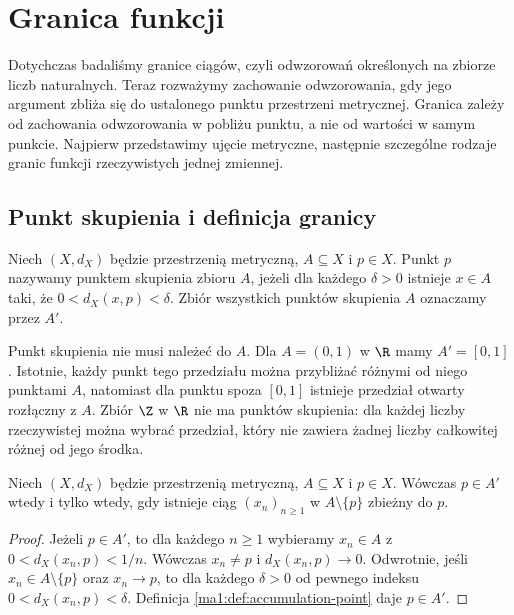 \chapter{Granica funkcji}
\label{ma1:ch:function-limits}

Dotychczas badaliśmy granice ciągów, czyli odwzorowań określonych na zbiorze liczb naturalnych. Teraz rozważymy zachowanie odwzorowania, gdy jego argument zbliża się do ustalonego punktu przestrzeni metrycznej. Granica zależy od zachowania odwzorowania w pobliżu punktu, a nie od wartości w samym punkcie. Najpierw przedstawimy ujęcie metryczne, następnie szczególne rodzaje granic funkcji rzeczywistych jednej zmiennej.

\section{Punkt skupienia i definicja granicy}
\begin{definicja}
\label{ma1:def:accumulation-point}
Niech $(X,d_X)$ będzie przestrzenią metryczną, $A\subseteq X$ i $p\in X$. Punkt $p$ nazywamy punktem skupienia zbioru $A$, jeżeli dla każdego $\delta>0$ istnieje $x\in A$ taki, że $0<d_X(x,p)<\delta$. Zbiór wszystkich punktów skupienia $A$ oznaczamy przez $A'$.
\end{definicja}
Punkt skupienia nie musi należeć do $A$. Dla $A=(0,1)$ w $\R$ mamy $A'=[0,1]$. Istotnie, każdy punkt tego przedziału można przybliżać różnymi od niego punktami $A$, natomiast dla punktu spoza $[0,1]$ istnieje przedział otwarty rozłączny z $A$. Zbiór $\Z$ w $\R$ nie ma punktów skupienia: dla każdej liczby rzeczywistej można wybrać przedział, który nie zawiera żadnej liczby całkowitej różnej od jego środka.

\begin{lemat}
\label{ma1:lem:accumulation-sequence}
Niech $(X,d_X)$ będzie przestrzenią metryczną, $A\subseteq X$ i $p\in X$. Wówczas $p\in A'$ wtedy i tylko wtedy, gdy istnieje ciąg $(x_n)_{n\ge1}$ w $A\setminus\{p\}$ zbieżny do $p$.
\end{lemat}
\begin{proof}
Jeżeli $p\in A'$, to dla każdego $n\ge1$ wybieramy $x_n\in A$ z $0<d_X(x_n,p)<1/n$. Wówczas $x_n\ne p$ i $d_X(x_n,p)\to0$. Odwrotnie, jeśli $x_n\in A\setminus\{p\}$ oraz $x_n\to p$, to dla każdego $\delta>0$ od pewnego indeksu $0<d_X(x_n,p)<\delta$. Definicja \ref{ma1:def:accumulation-point} daje $p\in A'$.
\end{proof}

